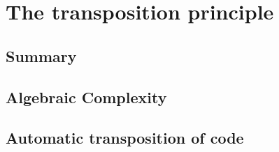 \newcommand{\bom}{\perp}  %
\newcommand{\al}{\prec}
\newcommand{\tAL}{\textsf{transAL}}
\newcommand{\Sbasis}{\mathcal{S}}  %
\newcommand{\Tbasis}{\mathcal{L}}  %
\newcommand{\lmul}[1]{{}_{#1}*}  %
\newcommand{\rmul}[1]{*_{#1}}  %
\newcommand{\op}{\mathrm{op}}  %
\newcommand{\RMod}[1]{#1\text{\sf-Mod}}  %
\newcommand{\ModR}[1]{\text{\sf Mod-}#1}  %
\newcommand{\pspace}{\mathcal{P}}  %
\newcommand{\s}{\underline}
\renewcommand{\l}{\overline}




\part{The transposition principle}

\chapter{Summary}


\chapter{Algebraic Complexity}





\chapter{Automatic transposition of code}







